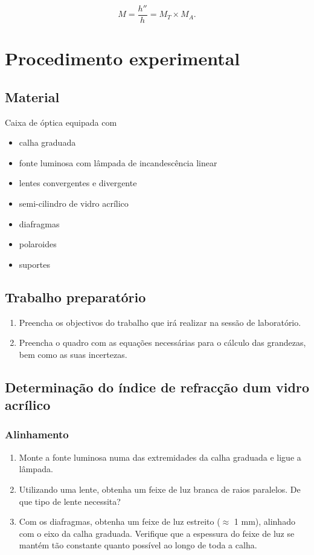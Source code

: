 \documentclass[a4paper,twoside,11pt]{report}      %
\begin{document}
\begin{equation}
M = \frac{h''}{h}=M_T\times M_A.
\end{equation}




\newpage
\section{\sf Procedimento experimental}


\subsection*{\sf Material}
Caixa de óptica equipada com
\begin{itemize}
\item calha graduada
\item fonte luminosa com lâmpada de incandescência linear
\item lentes convergentes e divergente
\item semi-cilindro de vidro acrílico
\item diafragmas
\item polaroides
\item suportes
\end{itemize}


\subsection*{\sf Trabalho preparatório} 
\begin{enumerate}
\item Preencha os objectivos do trabalho que irá realizar na sessão de laboratório. 
\item Preencha o quadro com as equações necessárias para o cálculo das grandezas, bem como as suas incertezas. 
\end{enumerate}


\subsection{\sf  Determinação do índice de refracção dum vidro acrílico }
\subsubsection*{\sf Alinhamento}
\begin{enumerate}
\item Monte a fonte luminosa numa das extremidades da calha graduada e ligue a lâmpada.
\item Utilizando uma lente, obtenha  um  feixe  de  luz  branca  de  raios  paralelos. De que tipo de lente necessita?
\item Com os diafragmas, obtenha um feixe de luz estreito ($\approx$ 1 mm), alinhado com o eixo da calha graduada. Verifique que a espessura do feixe de luz se mantém tão constante quanto possível ao longo de toda a calha.
\end{enumerate}
\end{document}
